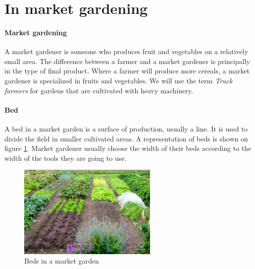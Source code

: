 

\section{In market gardening}

\paragraph{Market gardening} A market gardener is someone who produces fruit and vegetables on a relatively small area. The difference between a farmer and a market gardener is principally in the type of final product. Where a farmer will produce more cereals, a market gardener is specialized in fruits and vegetables. We will use the term \emph{Truck farmers} for gardens that are cultivated with heavy machinery.  


\paragraph{Bed} A bed in a market garden is a surface of production, usually a line. It is used to divide the field in smaller cultivated areas. A representation of beds is shown on figure \ref{fig:beds}. Market gardener usually choose the width of their beds according to the width of the tools they are going to use.

\begin{figure}
    \centering
    \includegraphics[width=0.6\textwidth]{images/beds.jpg}
    \caption{Beds in a market garden}
    \label{fig:beds}
\end{figure}

